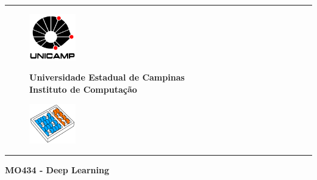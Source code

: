 \documentclass[11pt,letter]{article}
\begin{document}
	
	\sloppy
	
	\thispagestyle{empty}
	
	\begin{center}
		\rule{\textwidth}{1pt}
	\end{center}
	
	\vspace*{-0.2cm}
	
	\begin{figure}[!ht]
		\begin{minipage}[b]{2.3cm}
			\centering
			\hspace*{0.4cm}
			\includegraphics[width=2.0cm]{./fig/logo-unicamp-name-line-blk-red-0480-eps-converted-to.pdf}
		\end{minipage}
		\begin{minipage}[b]{11.1cm}
			\centering
			\hspace*{0.4cm}
			{\large \bf Universidade Estadual de Campinas} \\[0.2cm]
			{\large \bf Instituto de Computação}
		\end{minipage}
		\begin{minipage}[b]{2.3cm}
			\centering
			\hspace*{0.4cm}
			\includegraphics[width=2.0cm]{./fig/logo-ic-unicamp-slant-line-wht-sky-ora-0480-eps-converted-to.pdf}
		\end{minipage}
	\end{figure}
	
	\vspace*{-0.2cm}
	
	\begin{center}
		\rule{\textwidth}{1pt}
	\end{center}
	
	\vspace*{0.1cm}
	
	\begin{spacing}{1.2}
		\begin{center}
			{\Large \bf MO434 - Deep Learning}
			\\ [0.5cm]
		\end{center}
	\end{spacing}
	
\end{document}
